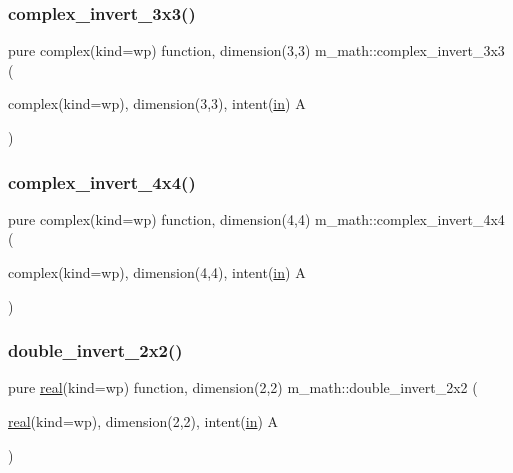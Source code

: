 \mbox{\label{namespacem__math_a09c8d8435741d02fc85dce5435a5630d}} 
\subsubsection{\texorpdfstring{complex\+\_\+invert\+\_\+3x3()}{complex\_invert\_3x3()}}
{\footnotesize\ttfamily pure complex(kind=wp) function, dimension(3,3) m\+\_\+math\+::complex\+\_\+invert\+\_\+3x3 (\begin{DoxyParamCaption}\item[{complex(kind=wp), dimension(3,3), intent(\hyperlink{M__journal_83_8txt_afce72651d1eed785a2132bee863b2f38}{in})}]{A }\end{DoxyParamCaption})\hspace{0.3cm}{\ttfamily [private]}}

\mbox{\label{namespacem__math_a8e3ef557757711b8ace73f51e44659a6}} 
\subsubsection{\texorpdfstring{complex\+\_\+invert\+\_\+4x4()}{complex\_invert\_4x4()}}
{\footnotesize\ttfamily pure complex(kind=wp) function, dimension(4,4) m\+\_\+math\+::complex\+\_\+invert\+\_\+4x4 (\begin{DoxyParamCaption}\item[{complex(kind=wp), dimension(4,4), intent(\hyperlink{M__journal_83_8txt_afce72651d1eed785a2132bee863b2f38}{in})}]{A }\end{DoxyParamCaption})\hspace{0.3cm}{\ttfamily [private]}}

\mbox{\label{namespacem__math_ae65562df2e78e7ebc0660a8f8b3a4030}} 
\subsubsection{\texorpdfstring{double\+\_\+invert\+\_\+2x2()}{double\_invert\_2x2()}}
{\footnotesize\ttfamily pure \hyperlink{read__watch_83_8txt_abdb62bde002f38ef75f810d3a905a823}{real}(kind=wp) function, dimension(2,2) m\+\_\+math\+::double\+\_\+invert\+\_\+2x2 (\begin{DoxyParamCaption}\item[{\hyperlink{read__watch_83_8txt_abdb62bde002f38ef75f810d3a905a823}{real}(kind=wp), dimension(2,2), intent(\hyperlink{M__journal_83_8txt_afce72651d1eed785a2132bee863b2f38}{in})}]{A }\end{DoxyParamCaption})\hspace{0.3cm}{\ttfamily [private]}}

